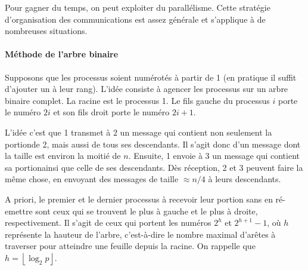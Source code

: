 Pour gagner du temps, on peut exploiter du parallélisme. Cette
stratégie d'organisation des communications est assez générale et
s'applique à de nombreuses situations.

\paragraph{Méthode de l'arbre binaire} Supposons que les processus soient
numérotés à partir de 1 (en pratique il suffit d'ajouter un à leur
rang). L'idée consiste à agencer les processus sur un arbre binaire
complet. La racine est le processus 1. Le fils gauche du processus $i$
porte le numéro $2i$ et son fils droit porte le numéro $2i+1$.

\begin{center}
\end{center}

L'idée c'est que 1 transmet à 2 un message qui contient non seulement la \og
portion\fg de 2, mais aussi de tous ses descendants. Il s'agit donc d'un message
dont la taille est environ la moitié de $n$. Ensuite, 1 envoie à 3 un message
qui contient sa \og portion\fg ainsi que celle de ses descendants. Dès
réception, 2 et 3 peuvent faire la même chose, en envoyant des messages de
taille $\approx n/4$ à leurs descendants.

A priori, le premier et le dernier processus à recevoir leur portion
sans en ré-emettre sont ceux qui se trouvent le plus à gauche et le
plus à droite, respectivement. Il s'agit de ceux qui portent les
numéros $2^h$ et $2^{h+1}-1$, où $h$ représente la hauteur de l'arbre,
c'est-à-dire le nombre maximal d'arêtes à traverser pour atteindre une
feuille depuis la racine. On rappelle que $h = \left\lfloor \log_2 p
\right\rfloor$.

